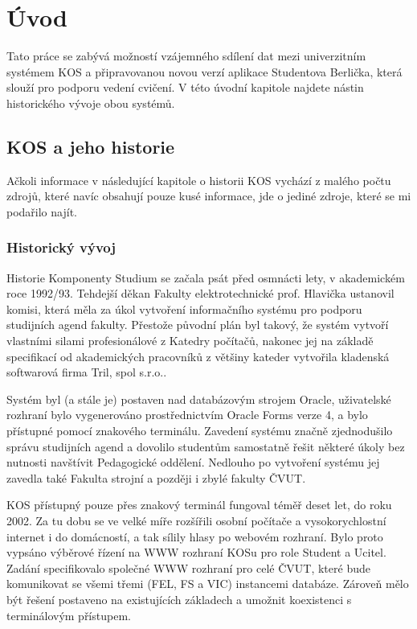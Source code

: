 \documentclass[11pt,twoside,a4paper]{book}
\begin{document}
\chapter{Úvod}

Tato práce se zabývá možností vzájemného sdílení dat mezi univerzitním systémem KOS a připravovanou novou verzí aplikace Studentova Berlička, která slouží pro podporu vedení cvičení. V této úvodní kapitole najdete nástin historického vývoje obou systémů.

\section{KOS a jeho historie}
Ačkoli informace v následující kapitole o historii KOS vychází z malého počtu zdrojů, které navíc obsahují pouze kusé informace, jde o jediné zdroje, které se mi podařilo najít.

\subsection{Historický vývoj}
Historie Komponenty Studium se začala psát před osmnácti lety, v akademickém roce 1992/93\cite{forum:historie-kos}. Tehdejší děkan Fakulty elektrotechnické prof. Hlavička ustanovil komisi, která měla za úkol vytvoření informačního systému pro podporu studijních agend fakulty. Přestože původní plán byl takový, že systém vytvoří vlastními silami profesionálové z Katedry počítačů, nakonec jej na základě specifikací od akademických pracovníků z většiny kateder vytvořila kladenská softwarová firma Tril, spol s.r.o.\cite{forum:neocekavana}.

Systém byl (a stále je) postaven nad databázovým strojem Oracle, uživatelské rozhraní bylo vygenerováno prostřednictvím Oracle Forms verze 4, a bylo přístupné pomocí znakového terminálu. Zavedení systému značně zjednodušilo správu studijních agend a dovolilo studentům samostatně řešit některé úkoly bez nutnosti navštívit Pedagogické oddělení. Nedlouho po vytvoření systému jej zavedla také Fakulta strojní a později i zbylé fakulty ČVUT.

KOS přístupný pouze přes znakový terminál fungoval téměř deset let, do roku 2002. Za tu dobu se ve velké míře rozšířili osobní počítače a vysokorychlostní internet i do domácností, a tak sílily hlasy po webovém rozhraní. Bylo proto vypsáno výběrové řízení na WWW rozhraní KOSu pro role Student a Ucitel. Zadání specifikovalo společné WWW rozhraní pro celé ČVUT, které bude komunikovat se všemi třemi (FEL, FS a VIC) instancemi  databáze. Zároveň mělo být řešení postaveno na existujících základech a umožnit koexistenci s terminálovým přístupem. 
\end{document}

